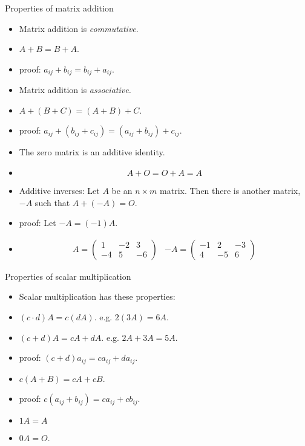 \documentclass{beamer}
\begin{document}
\begin{frame}{Properties of matrix addition}

\begin{itemize}
\item Matrix addition is \emph{commutative}.
\item $A+B = B + A$.
\item proof: $a_{ij} + b_{ij} = b_{ij} + a_{ij}$.
\item Matrix addition is \emph{associative.}
\item $A + (B + C) = (A + B) + C$.
\item proof: $a_{ij} + (b_{ij} + c_{ij}) = (a_{ij} + b_{ij}) + c_{ij}$.
\item The zero matrix is an additive identity.
\item $$A+O = O + A = A$$
\item Additive inverses: Let $A$ be an $n\times m$ matrix. Then there is another
matrix, $-A$ such that $A+(-A) = O$.
\item proof: Let $-A = (-1) A$.
\item
$$
\begin{matrix}

A =

\begin{pmatrix}
1 & -2 & 3\\
-4 & 5  & -6
\end{pmatrix}

&

-A =

\begin{pmatrix}
-1 & 2 & -3\\
4 & -5  & 6
\end{pmatrix}

\end{matrix}
$$
\end{itemize}

\end{frame}


\begin{frame}{Properties of scalar multiplication}

\begin{itemize}
\item Scalar multiplication has these properties:
\item $(c \cdot d) A = c ( d A)$. e.g. $2(3 A) = 6 A$.
\item $(c + d) A = c A + d A$. e.g. $2A + 3A = 5 A$.
\item proof: $(c+d)a_{ij} = c a_{ij} + d a_{ij}$.
\item $c (A + B) = cA + cB$.
\item proof: $c (a_{ij} + b_{ij}) = c a_{ij} + c b_{ij}$.
\item $1 A = A$
\item $0 A = O$.
\end{itemize}

\end{frame}
\end{document}
